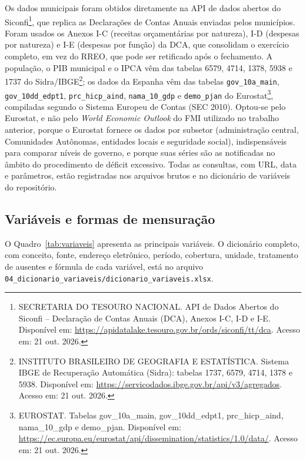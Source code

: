 Os dados municipais foram obtidos diretamente na API de dados abertos do Siconfi\footnote{SECRETARIA DO TESOURO NACIONAL. API de Dados Abertos do Siconfi -- Declaração de Contas Anuais (DCA), Anexos I-C, I-D e I-E. Disponível em: \url{https://apidatalake.tesouro.gov.br/ords/siconfi/tt/dca}. Acesso em: 21 out. 2026.}, que replica as Declarações de Contas Anuais enviadas pelos municípios. Foram usados os Anexos I-C (receitas orçamentárias por natureza), I-D (despesas por natureza) e I-E (despesas por função) da DCA, que consolidam o exercício completo, em vez do RREO, que pode ser retificado após o fechamento. A população, o PIB municipal e o IPCA vêm das tabelas 6579, 4714, 1378, 5938 e 1737 do Sidra/IBGE\footnote{INSTITUTO BRASILEIRO DE GEOGRAFIA E ESTATÍSTICA. Sistema IBGE de Recuperação Automática (Sidra): tabelas 1737, 6579, 4714, 1378 e 5938. Disponível em: \url{https://servicodados.ibge.gov.br/api/v3/agregados}. Acesso em: 21 out. 2026.}; os dados da Espanha vêm das tabelas \texttt{gov\_10a\_main}, \texttt{gov\_10dd\_edpt1}, \texttt{prc\_hicp\_aind}, \texttt{nama\_10\_gdp} e \texttt{demo\_pjan} do Eurostat\footnote{EUROSTAT. Tabelas gov\_10a\_main, gov\_10dd\_edpt1, prc\_hicp\_aind, nama\_10\_gdp e demo\_pjan. Disponível em: \url{https://ec.europa.eu/eurostat/api/dissemination/statistics/1.0/data/}. Acesso em: 21 out. 2026.}, compiladas segundo o Sistema Europeu de Contas (SEC 2010). Optou-se pelo Eurostat, e não pelo \textit{World Economic Outlook} do FMI utilizado no trabalho anterior, porque o Eurostat fornece os dados por subsetor (administração central, Comunidades Autônomas, entidades locais e seguridade social), indispensáveis para comparar níveis de governo, e porque suas séries são as notificadas no âmbito do procedimento de déficit excessivo. Todas as consultas, com URL, data e parâmetros, estão registradas nos arquivos brutos e no dicionário de variáveis do repositório.

\subsection{Variáveis e formas de mensuração}

O Quadro~\ref{tab:variaveis} apresenta as principais variáveis. O dicionário completo, com conceito, fonte, endereço eletrônico, período, cobertura, unidade, tratamento de ausentes e fórmula de cada variável, está no arquivo \texttt{04\_dicionario\_variaveis/dicionario\_variaveis.xlsx}.

